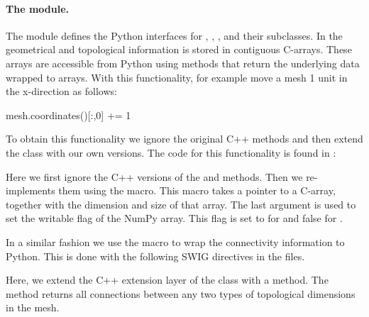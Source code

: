 \paragraph{The  module.}
The  module defines the Python interfaces for ,
, , and their subclasses. In
 the geometrical and topological information is stored in
contiguous C-arrays. These arrays are accessible from Python using
methods that return the underlying data wrapped to \numpy arrays. With
this functionality, for example move a mesh 1 unit in the
x-direction as follows:
\begin{python}
mesh.coordinates()[:,0] += 1
\end{python}
To obtain this functionality we ignore the original C++ methods and
then extend the  class with our own versions. The code for
this functionality is found in :
Here we first ignore the C++ versions of the  and
 methods. Then we re-implements them using the
 macro. This macro takes a pointer to a
C-array, together with the dimension and size of that array. The last
argument is used to set the writable flag of the NumPy array. This
flag is set to  for  and false for
.

In a similar fashion we use the  macro to wrap
the connectivity information to Python. This is done with the
following SWIG directives in the  files.
Here, we extend the C++ extension layer of the
 class with a 
method. The method returns all connections between any two types of
topological dimensions in the mesh.

